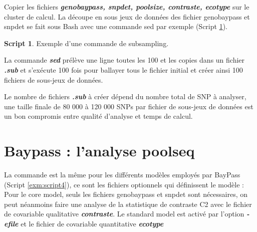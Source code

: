 \documentclass[
  openany]{book}
\newenvironment{Shaded}{\begin{snugshade}}{\end{snugshade}}
\newcommand{\AttributeTok}[1]{\textcolor[rgb]{0.13,0.29,0.53}{#1}}
\newcommand{\ControlFlowTok}[1]{\textcolor[rgb]{0.13,0.29,0.53}{\textbf{#1}}}
\newcommand{\DataTypeTok}[1]{\textcolor[rgb]{0.13,0.29,0.53}{#1}}
\newcommand{\DecValTok}[1]{\textcolor[rgb]{0.00,0.00,0.81}{#1}}
\newcommand{\FunctionTok}[1]{\textcolor[rgb]{0.13,0.29,0.53}{\textbf{#1}}}
\newcommand{\KeywordTok}[1]{\textcolor[rgb]{0.13,0.29,0.53}{\textbf{#1}}}
\newcommand{\NormalTok}[1]{#1}
\newcommand{\OperatorTok}[1]{\textcolor[rgb]{0.81,0.36,0.00}{\textbf{#1}}}
\newcommand{\StringTok}[1]{\textcolor[rgb]{0.31,0.60,0.02}{#1}}
\newcommand{\VariableTok}[1]{\textcolor[rgb]{0.00,0.00,0.00}{#1}}
\theoremstyle{definition}
\theoremstyle{definition}
\newtheorem{example}{Script}[chapter]
\theoremstyle{definition}
\theoremstyle{definition}
\theoremstyle{remark}
\begin{document}
Copier les fichiers \textbf{\emph{genobaypass, snpdet, poolsize, contraste, ecotype}} sur le cluster de calcul.
La découpe en sous jeux de données des fichier genobaypass et snpdet se fait sous Bash avec une commande sed par exemple (Script \ref{exm:script3}).

\begin{example}
\protect\hypertarget{exm:script3}{}\label{exm:script3}{Exemple d'une commande de subsampling.}
\end{example}

La commande \textbf{\emph{sed}} prélève une ligne toutes les 100 et les copies dans un fichier \textbf{\emph{.sub}} et s'exécute 100 fois pour ballayer tous le fichier initial et créer ainsi 100 fichiers de sous-jeux de données.

\begin{Shaded}
\end{Shaded}

Le nombre de fichiers \textbf{\emph{.sub}} à créer dépend du nombre total de SNP à analyser, une taille finale de 80 000 à 120 000 SNPs par fichier de sous-jeux de données est un bon compromis entre qualité d'analyse et temps de calcul.

\hypertarget{baypass-lanalyse-poolseq}{%
\chapter*{Baypass : l'analyse poolseq}\label{baypass-lanalyse-poolseq}}

La commande est la même pour les différents modèles employés par BayPass (Script \ref{exm:script4}), ce sont les fichiers optionnels qui définissent le modèle :
Pour le core model, seuls les fichiers genobaypass et snpdet sont nécessaires, on peut néanmoins faire une analyse de la statistique de contraste C2 avec le fichier de covariable qualitative \textbf{\emph{contraste}}.
Le standard model est activé par l'option \textbf{\emph{-efile}} et le fichier de covariable quantitative \textbf{\emph{ecotype}}
\end{document}
